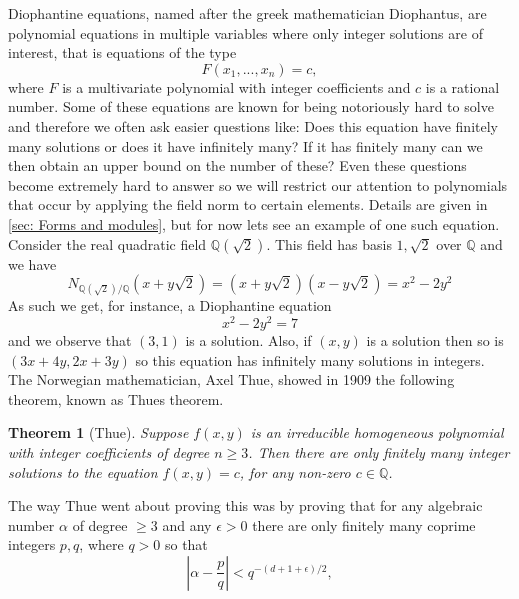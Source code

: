 \documentclass{article}
\newtheorem{theorem}{Theorem}[section]
\newcommand{\mbb}[1]{\mathbb{#1}}
\numberwithin{equation}{section}
\begin{document}
Diophantine equations, named after the greek mathematician Diophantus, are polynomial equations in multiple variables where only integer solutions are of interest, that is equations of the type
\begin{equation}\label{eq: General diophantine equation}
	F(x_1, ..., x_n) = c,
\end{equation}
where $F$ is a multivariate polynomial with integer coefficients and $c$ is a rational number. Some of these equations are known for being notoriously hard to solve and therefore we often ask easier questions like: Does this equation have finitely many solutions or does it have infinitely many? If it has finitely many can we then obtain an upper bound on the number of these? Even these questions become extremely hard to answer so we will restrict our attention to polynomials that occur by applying the field norm to certain elements. Details are given in \cref{sec: Forms and modules}, but for now lets see an example of one such equation. Consider the real quadratic field $\mbb Q(\sqrt 2)$. This field has basis $1,\sqrt 2$ over $\mbb Q$ and we have
$$N_{\mbb Q(\sqrt 2)/\mbb Q}(x + y\sqrt 2) = (x + y\sqrt 2)(x - y\sqrt 2) = x^2 - 2y^2$$
As such we get, for instance, a Diophantine equation
$$x^2 - 2y^2 = 7$$
and we observe that $(3,1)$ is a solution. Also, if $(x,y)$ is a solution then so is $(3x + 4y, 2x + 3y)$ so this equation has infinitely many solutions in integers. The Norwegian mathematician, Axel Thue, showed in 1909 the following theorem, known as Thues theorem.
\begin{theorem}[Thue]\label{thm: Thues theorem introduction}
	Suppose $f(x,y)$ is an irreducible homogeneous polynomial with integer coefficients of degree $n \geq 3$. Then there are only finitely many integer solutions to the equation $f(x,y) = c$, for any non-zero $c \in \mbb{Q}$.
\end{theorem}
The way Thue went about proving this was by proving that for any algebraic number $\alpha$ of degree $\geq 3$ and any $\epsilon > 0$ there are only finitely many coprime integers $p,q$, where $q > 0$ so that
$$|\alpha - \frac{p}{q}| < q^{-(d+1+\epsilon)/2},$$
\end{document}
